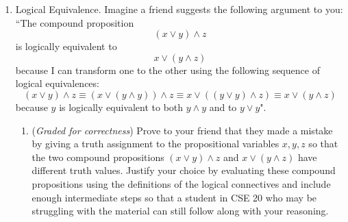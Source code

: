 \documentclass[12pt, oneside]{article}
\newcommand{\gradeCorrect}{({\it Graded for correctness}) }
\newcommand{\gradeComplete}{({\it Graded for completeness}) }
\begin{document}
\begin{enumerate}[labelindent=0pt, leftmargin=0pt]
\begin{enumerate}
        \item\gradeCorrect
        Construct an expression (as a compound proposition) for $y_0$ in terms of the inputs 
        $x_3, x_2, x_1, x_0$. Justify your expression by referring to the definition of the logic 
        gates XOR, AND, OR, NOT and the definition of the function $f$. Hint: our work on the half-adder might 
        be helpful.
        \item\gradeCorrect
        Construct an expression (as a compound proposition) for $y_1$ in terms of the inputs 
        $x_3, x_2, x_1, x_0$. Justify your expression by referring to the definition of the logic 
        gates XOR, AND, OR, NOT and the definition of the function $f$. Hint: our work on the half-adder might 
        be helpful.
        \item\gradeComplete Draw a combinatorial circuit corresponding to these compound propositions.
        Remember that the symbols for the inputs will be on the left-hand-side and 
        the symbol for the outputs $y_0$ and $y_1$ will be on the right-hand side. Use gates (draw the appropriate
        shapes and add labels for clarity) and wires to connect the inputs appropriately to give the output.
        \item\gradeComplete Construct expressions (as a compound propositions) for $y_2$ and $y_3$ 
        in terms of the inputs  $x_3, x_2, x_1, x_0$. Are these similar to the expressions for $y_0$ and $y_1$?
        \end{enumerate}
        \item Logical Equivalence. Imagine a friend suggests the following argument to you: ``The compound proposition
        \[
        (x \lor y) \land z
        \]
        is logically equivalent to 
        \[
        x \lor (y \land z)
        \]
        because I can transform one to the other using the following sequence of logical equivalences: 
        \[
           (x \lor y) \land z \equiv
           (x \lor (y \land y)) \land z \equiv
           x \lor ( (y \lor y) \land z) \equiv x \lor (y \land z) 
        \]
        because $y$ is logically equivalent to both $y \land y$ and to $y \lor y$".
        
        \begin{enumerate}
        \item\gradeCorrect Prove to your friend that they made a mistake by giving a truth
        assignment to the propositional variables $x,y,z$ so that 
        the two compound propositions 
        $ (x \lor y) \land z$ and $ x \lor (y \land z)$ have different truth values.
        Justify your choice by evaluating these compound propositions using the definitions of the logical connectives 
        and include enough intermediate steps so that a student in CSE 20 who may be 
        struggling with the material can still follow along with your reasoning.
        

\end{enumerate}
\end{enumerate}
\end{document}

